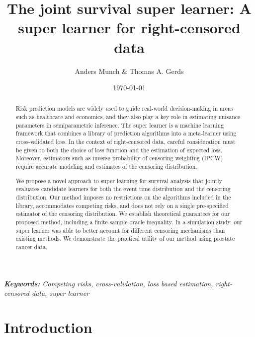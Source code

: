 \documentclass[a4paper,danish]{article}
\title{The joint survival super learner: A super learner for right-censored
  data}
\author{Anders Munch \& Thomas A. Gerds}
\date{\today}
\theoremstyle{plain} %
\numberwithin{theorem}{section}
\theoremstyle{definition} %
\theoremstyle{remark}
\newcommand{\1}{\mathds{1}}
\begin{document}
\maketitle


\begin{abstract} Risk prediction models are widely used to guide
real-world decision-making in areas such as healthcare and economics,
and they also play a key role in estimating nuisance parameters in
semiparametric inference. The super learner is a machine learning
framework that combines a library of prediction algorithms into a
meta-learner using cross-validated loss. In the context of
right-censored data, careful consideration must be given to both the
choice of loss function and the estimation of expected loss. Moreover,
estimators such as inverse probability of censoring weighting (IPCW)
require accurate modeling and estimates of the censoring distribution.

We propose a novel approach to super learning for survival analysis
that jointly evaluates candidate learners for both the event time
distribution and the censoring distribution. Our method imposes no
restrictions on the algorithms included in the library, accommodates
competing risks, and does not rely on a single pre-specified estimator
of the censoring distribution. We establish theoretical guarantees for
our proposed method, including a finite-sample oracle inequality. In a
simulation study, our super learner was able to better account for
different censoring mechanisms than existing methods. We demonstrate
the practical utility of our method using prostate cancer data.
\end{abstract}

\textit{\textbf{Keywords:} Competing risks, cross-validation,
  loss based estimation, right-censored data, super learner}

\section{Introduction}
\label{sec:introduction}
\end{document}
